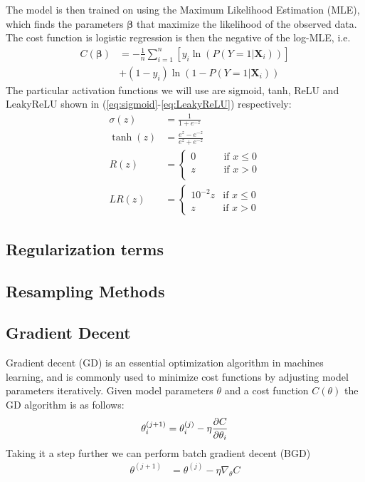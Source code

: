 \documentclass[%
reprint,
amsmath,amssymb,
aps,
]{revtex4-2}
\begin{document}
The model is then trained on using the Maximum Likelihood Estimation (MLE), which finds the parameters $\bm\beta$ that maximize the likelihood of the observed data. The cost function is logistic regression is then the negative of the log-MLE, i.e.
\begin{align}
	C(\bm\beta)&=-\frac{1}{n}\sum_{i=1}^n[y_i\ln(P(Y=1|\bm X_i))]\\
	&+(1-y_i)\ln(1-P(Y=1|\bm X_i))
\end{align}
The particular activation functions we will use are sigmoid, tanh, ReLU and LeakyReLU shown in (\ref{eq:sigmoid}-\ref{eq:LeakyReLU}) respectively:
\begin{align}
	\label{eq:sigmoid}
	\sigma(z)&=\frac{1}{1+e^{-z}}\\
	\label{eq:tanh}
	\tanh(z)&=\frac{e^z-e^{-z}}{e^z+e^{-z}}\\
	\label{eq:ReLU}
	R(z)&=\begin{cases}
		0 &\qquad\text{if }x\leq0\\
		z &\qquad\text{if }x>0\\
	\end{cases}\\
	\label{eq:LeakyReLU}
	LR(z)&=\begin{cases}
		10^{-2}z&\text{if }x\leq0\\
		z &\text{if }x>0
	\end{cases}
\end{align}

\subsection{Regularization terms}

\subsection{Resampling Methods}

\subsection{Gradient Decent}
Gradient decent (GD) is an essential optimization algorithm in machines learning, and is commonly used to minimize cost functions by adjusting model parameters iteratively. Given model parameters $\theta$ and a cost function $C(\theta)$ the GD algorithm is as follows:
\begin{align}
	\theta_i^{(j+1)}=\theta_i^{(j)}-\eta\pdv{C}{\theta_i}
\end{align}
Taking it a step further we can perform batch gradient decent (BGD)
\begin{align}
	\theta^{(j+1)}&=\theta^{(j)}-\eta\nabla_\theta C
\end{align}
\end{document}
